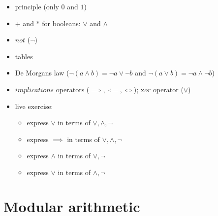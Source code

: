 \documentclass[a4paper,12pt]{article}
\providecommand{\tightlist}{\setlength{\itemsep}{0pt}\setlength{\parskip}{0pt}}
\newcommand{\lxor}{\veebar}
\begin{document}
	\begin{itemize}
	\tightlist
	\item
	principle (only \(0\) and \(1\))
	\item
	\(+\) and \(*\) for booleans: \(\lor\) and \(\land\)
	\item
	\(not\) (\(\lnot\))
	\item
	tables
	\item
	De Morgan\textquotesingle s law
	(\(\lnot (a \land b) = \lnot a \lor \lnot b\) and
	\(\lnot (a \lor b) = \lnot a \land \lnot b\))
	\item
	\(implications\) operators (\(\implies, \impliedby, \iff\));
	\(\text{x}or\) operator (\(\lxor\))
	\item
	live exercise:
	
	\begin{itemize}
		\tightlist
		\item
		express \(\lxor\) in terms of \(\lor, \land, \lnot\)
		\item
		express \(\implies\) in terms of \(\lor, \land, \lnot\)
		\item
		express \(\land\) in terms of \(\lor, \lnot\)
		\item
		express \(\lor\) in terms of \(\land, \lnot\)
	\end{itemize}
	\end{itemize}
	
	
	
	
	
	
	\section{Modular arithmetic}
	
\end{document}
